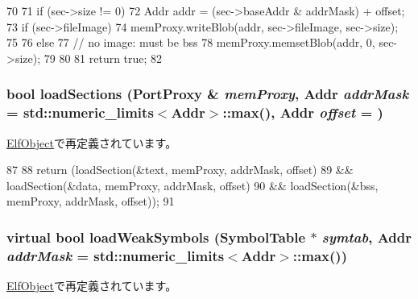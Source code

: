 \begin{DoxyCode}
70 {
71     if (sec->size != 0) {
72         Addr addr = (sec->baseAddr & addrMask) + offset;
73         if (sec->fileImage) {
74             memProxy.writeBlob(addr, sec->fileImage, sec->size);
75         }
76         else {
77             // no image: must be bss
78             memProxy.memsetBlob(addr, 0, sec->size);
79         }
80     }
81     return true;
82 }
\end{DoxyCode}
\hypertarget{classObjectFile_a69ba3469bb66a1ffa5049d581c1faf70}{
\subsubsection[{loadSections}]{\setlength{\rightskip}{0pt plus 5cm}bool loadSections ({\bf PortProxy} \& {\em memProxy}, \/  {\bf Addr} {\em addrMask} = {\ttfamily std::numeric\_\-limits$<${\bf Addr}$>$::max()}, \/  {\bf Addr} {\em offset} = {})}}
\label{classObjectFile_a69ba3469bb66a1ffa5049d581c1faf70}


\hyperlink{classElfObject_a69ba3469bb66a1ffa5049d581c1faf70}{ElfObject}で再定義されています。


\begin{DoxyCode}
87 {
88     return (loadSection(&text, memProxy, addrMask, offset)
89             && loadSection(&data, memProxy, addrMask, offset)
90             && loadSection(&bss, memProxy, addrMask, offset));
91 }
\end{DoxyCode}
\hypertarget{classObjectFile_ad466ccc8c0bb76d0ff5a2e7e965a2200}{
\subsubsection[{loadWeakSymbols}]{\setlength{\rightskip}{0pt plus 5cm}virtual bool loadWeakSymbols ({\bf SymbolTable} $\ast$ {\em symtab}, \/  {\bf Addr} {\em addrMask} = {\ttfamily std::numeric\_\-limits$<${\bf Addr}$>$::max()})}}
\label{classObjectFile_ad466ccc8c0bb76d0ff5a2e7e965a2200}


\hyperlink{classElfObject_a4469ce4747735e4ecee3a7d5edafaf54}{ElfObject}で再定義されています。



